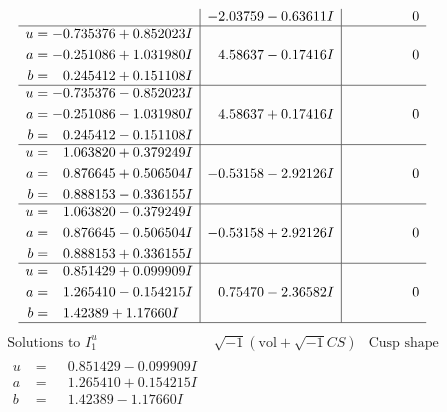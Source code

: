 \documentclass[1p]{elsarticle_modified}
\theoremstyle{definition}
\newcommand{\I}{\sqrt{-1}}
\begin{document}
$$\begin{array}{c|c|c}
 & -2.03759 - 0.63611 I & \phantom{-0.000000 } 0 \\ \hline\begin{aligned}
u &= -0.735376 + 0.852023 I \\
a &= -0.251086 + 1.031980 I \\
b &= \phantom{-}0.245412 + 0.151108 I\end{aligned}
 & \phantom{-}4.58637 - 0.17416 I & \phantom{-0.000000 } 0 \\ \hline\begin{aligned}
u &= -0.735376 - 0.852023 I \\
a &= -0.251086 - 1.031980 I \\
b &= \phantom{-}0.245412 - 0.151108 I\end{aligned}
 & \phantom{-}4.58637 + 0.17416 I & \phantom{-0.000000 } 0 \\ \hline\begin{aligned}
u &= \phantom{-}1.063820 + 0.379249 I \\
a &= \phantom{-}0.876645 + 0.506504 I \\
b &= \phantom{-}0.888153 - 0.336155 I\end{aligned}
 & -0.53158 - 2.92126 I & \phantom{-0.000000 } 0 \\ \hline\begin{aligned}
u &= \phantom{-}1.063820 - 0.379249 I \\
a &= \phantom{-}0.876645 - 0.506504 I \\
b &= \phantom{-}0.888153 + 0.336155 I\end{aligned}
 & -0.53158 + 2.92126 I & \phantom{-0.000000 } 0 \\ \hline\begin{aligned}
u &= \phantom{-}0.851429 + 0.099909 I \\
a &= \phantom{-}1.265410 - 0.154215 I \\
b &= \phantom{-}1.42389 + 1.17660 I\end{aligned}
 & \phantom{-}0.75470 - 2.36582 I & \phantom{-0.000000 } 0\\
 \hline 
 \end{array}$$\newpage$$\begin{array}{c|c|c}  
\text{Solutions to }I^u_{1}& \I (\text{vol} + \sqrt{-1}CS) & \text{Cusp shape}\\
 \hline 
\begin{aligned}
u &= \phantom{-}0.851429 - 0.099909 I \\
a &= \phantom{-}1.265410 + 0.154215 I \\
b &= \phantom{-}1.42389 - 1.17660 I\end{aligned}

\end{array}$$
\end{document}
